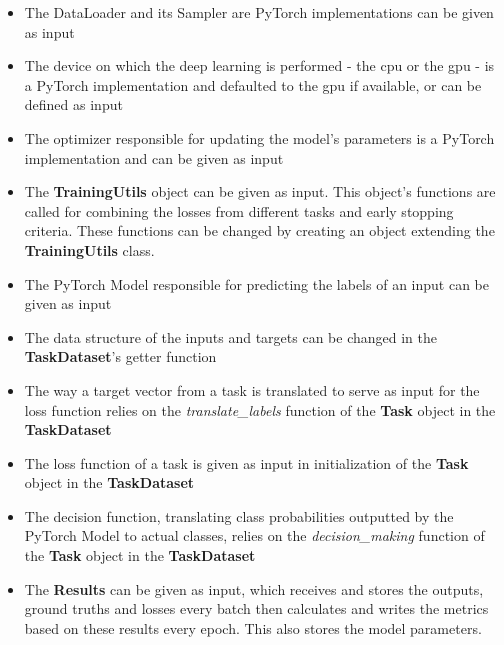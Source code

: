 \begin{itemize}
	\item The DataLoader and its Sampler are PyTorch implementations can be given as input
	\item The device on which the deep learning is performed - the cpu or the gpu - is a PyTorch implementation and defaulted to the gpu if available, or can be defined as input
	\item The optimizer responsible for updating the model's parameters is a PyTorch implementation and can be given as input
	\item The \textbf{TrainingUtils} object can be given as input. This object's functions are called for combining the losses from different tasks and early stopping criteria. These functions can be changed by creating an object extending the \textbf{TrainingUtils} class.
	\item The PyTorch Model responsible for predicting the labels of an input can be given as input
	\item The data structure of the inputs and targets can be changed in the \textbf{TaskDataset}'s getter function
	\item The way a target vector from a task is translated to serve as input for the loss function relies on the \textit{translate\_labels} function of the \textbf{Task} object in the \textbf{TaskDataset}
	\item The loss function of a task is given as input in initialization of the \textbf{Task} object in the \textbf{TaskDataset}
	\item The decision function, translating class probabilities outputted by the PyTorch Model to actual classes, relies on the \textit{decision\_making} function of the \textbf{Task} object in the \textbf{TaskDataset}
	\item The \textbf{Results} can be given as input, which receives and stores the outputs, ground truths and losses every batch then calculates and writes the metrics based on these results every epoch. This also stores the model parameters. 	
\end{itemize}


